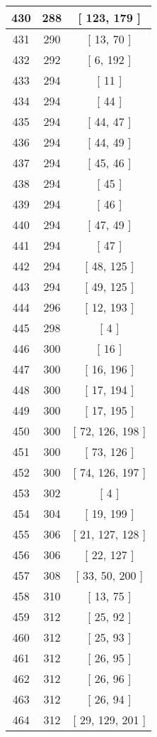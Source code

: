 \begin{center}
\begin{longtable}[H]{|| c c c ||}
\hline
430 & 288 & [ 123, 179 ] \\ 
\hline
431 & 290 & [ 13, 70 ] \\ 
\hline
432 & 292 & [ 6, 192 ] \\ 
\hline
433 & 294 & [ 11 ] \\ 
\hline
434 & 294 & [ 44 ] \\ 
\hline
435 & 294 & [ 44, 47 ] \\ 
\hline
436 & 294 & [ 44, 49 ] \\ 
\hline
437 & 294 & [ 45, 46 ] \\ 
\hline
438 & 294 & [ 45 ] \\ 
\hline
439 & 294 & [ 46 ] \\ 
\hline
440 & 294 & [ 47, 49 ] \\ 
\hline
441 & 294 & [ 47 ] \\ 
\hline
442 & 294 & [ 48, 125 ] \\ 
\hline
443 & 294 & [ 49, 125 ] \\ 
\hline
444 & 296 & [ 12, 193 ] \\ 
\hline
445 & 298 & [ 4 ] \\ 
\hline
446 & 300 & [ 16 ] \\ 
\hline
447 & 300 & [ 16, 196 ] \\ 
\hline
448 & 300 & [ 17, 194 ] \\ 
\hline
449 & 300 & [ 17, 195 ] \\ 
\hline
450 & 300 & [ 72, 126, 198 ] \\ 
\hline
451 & 300 & [ 73, 126 ] \\ 
\hline
452 & 300 & [ 74, 126, 197 ] \\ 
\hline
453 & 302 & [ 4 ] \\ 
\hline
454 & 304 & [ 19, 199 ] \\ 
\hline
455 & 306 & [ 21, 127, 128 ] \\ 
\hline
456 & 306 & [ 22, 127 ] \\ 
\hline
457 & 308 & [ 33, 50, 200 ] \\ 
\hline
458 & 310 & [ 13, 75 ] \\ 
\hline
459 & 312 & [ 25, 92 ] \\ 
\hline
460 & 312 & [ 25, 93 ] \\ 
\hline
461 & 312 & [ 26, 95 ] \\ 
\hline
462 & 312 & [ 26, 96 ] \\ 
\hline
463 & 312 & [ 26, 94 ] \\ 
\hline
464 & 312 & [ 29, 129, 201 ] \\ 
\hline

\end{longtable}
\end{center}
